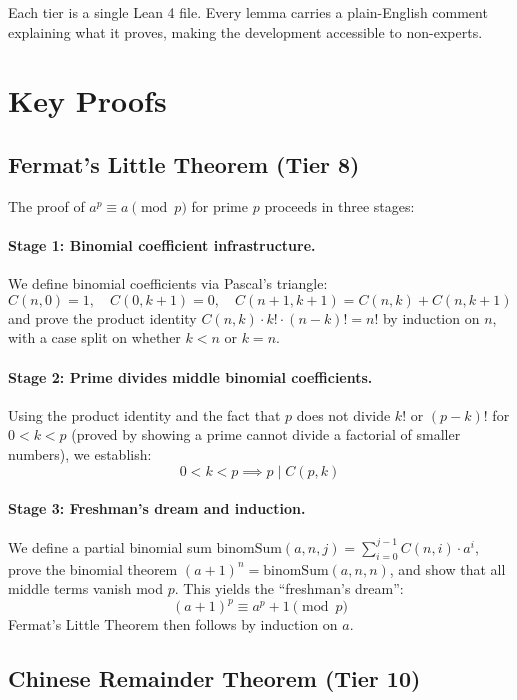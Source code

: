 \documentclass[11pt]{article}
\begin{document}
Each tier is a single Lean 4 file. Every lemma carries a plain-English comment explaining what it proves, making the development accessible to non-experts.

\section{Key Proofs}

\subsection{Fermat's Little Theorem (Tier 8)}

The proof of $a^p \equiv a \pmod{p}$ for prime $p$ proceeds in three stages:

\paragraph{Stage 1: Binomial coefficient infrastructure.} We define binomial coefficients via Pascal's triangle:
\[
C(n, 0) = 1, \quad C(0, k+1) = 0, \quad C(n+1, k+1) = C(n,k) + C(n, k+1)
\]
and prove the product identity $C(n,k) \cdot k! \cdot (n-k)! = n!$ by induction on $n$, with a case split on whether $k < n$ or $k = n$.

\paragraph{Stage 2: Prime divides middle binomial coefficients.} Using the product identity and the fact that $p$ does not divide $k!$ or $(p-k)!$ for $0 < k < p$ (proved by showing a prime cannot divide a factorial of smaller numbers), we establish:
\[
0 < k < p \implies p \mid C(p, k)
\]

\paragraph{Stage 3: Freshman's dream and induction.} We define a partial binomial sum $\text{binomSum}(a, n, j) = \sum_{i=0}^{j-1} C(n,i) \cdot a^i$, prove the binomial theorem $(a+1)^n = \text{binomSum}(a, n, n)$, and show that all middle terms vanish mod $p$. This yields the ``freshman's dream'':
\[
(a+1)^p \equiv a^p + 1 \pmod{p}
\]
Fermat's Little Theorem then follows by induction on $a$.

\subsection{Chinese Remainder Theorem (Tier 10)}
\end{document}
